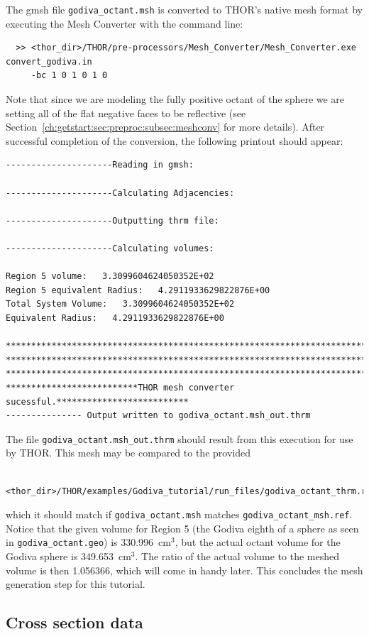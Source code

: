 The gmsh file \verb"godiva_octant.msh" is converted to THOR's native mesh format by executing the Mesh Converter with the command line:
\begin{verbatim}
  >> <thor_dir>/THOR/pre-processors/Mesh_Converter/Mesh_Converter.exe convert_godiva.in
     -bc 1 0 1 0 1 0
\end{verbatim}
Note that since we are modeling the fully positive octant of the sphere we are setting all of the flat negative faces to be reflective (see Section~\ref{ch:getstart:sec:preproc:subsec:meshconv} for more details).
After successful completion of the conversion, the following printout should appear:
\begin{verbatim}
---------------------Reading in gmsh:

---------------------Calculating Adjacencies:

---------------------Outputting thrm file:

---------------------Calculating volumes:

Region 5 volume:   3.3099604624050352E+02
Region 5 equivalent Radius:   4.2911933629822876E+00
Total System Volume:   3.3099604624050352E+02
Equivalent Radius:   4.2911933629822876E+00

**********************************************************************************
**********************************************************************************
**********************************************************************************
**************************THOR mesh converter sucessful.**************************
--------------- Output written to godiva_octant.msh_out.thrm
\end{verbatim}

The file \verb"godiva_octant.msh_out.thrm" should result from this execution for use by THOR.
This mesh may be compared to the provided
\begin{verbatim}
  <thor_dir>/THOR/examples/Godiva_tutorial/run_files/godiva_octant_thrm.ref
\end{verbatim}
which it should match if \verb"godiva_octant.msh" matches \verb"godiva_octant_msh.ref".
Notice that the given volume for Region 5 (the Godiva eighth of a sphere as seen in \verb"godiva_octant.geo") is 330.996~cm$^3$, but the actual octant volume for the Godiva sphere is 349.653~cm$^3$.
The ratio of the actual volume to the meshed volume is then 1.056366, which will come in handy later.
This concludes the mesh generation step for this tutorial.

\subsection{Cross section data}

